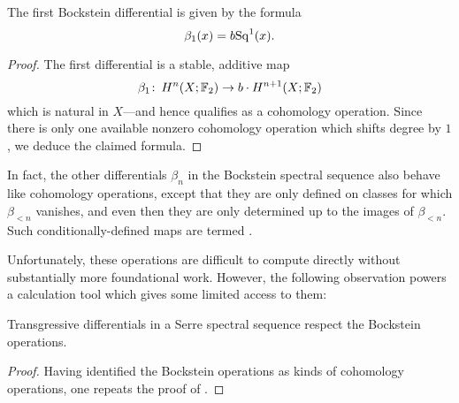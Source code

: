 \begin{lemma}%
The first Bockstein differential is given by the formula \[\beta_1(x) = b \mathrm{Sq}^1(x).\]
\end{lemma}
\begin{proof}
The first differential is a stable, additive map \[\beta_1\colon\thinspace H^n(X; \mathbb F_2) \to b \cdot H^{n+1}(X; \mathbb F_2)\] which is natural in $X$---and hence qualifies as a cohomology operation.
Since there is only one available nonzero cohomology operation which shifts degree by $1$, we deduce the claimed formula.
\end{proof}

\begin{definition}
In fact, the other differentials $\beta_n$ in the Bockstein spectral sequence also behave like cohomology operations, except that they are only defined on classes for which $\beta_{<n}$ vanishes, and even then they are only determined up to the images of $\beta_{<n}$.
Such conditionally-defined maps are termed .
\end{definition}

Unfortunately, these operations are difficult to compute directly without substantially more foundational work.
However, the following observation powers a calculation tool which gives some limited access to them:

\begin{corollary}
Transgressive differentials in a Serre spectral sequence respect the Bockstein operations.
\end{corollary}
\begin{proof}
Having identified the Bockstein operations as kinds of cohomology operations, one repeats the proof of .
\end{proof}

